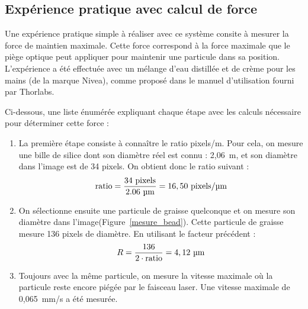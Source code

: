 \subsection{Expérience pratique avec calcul de force}
Une expérience pratique simple à réaliser avec ce système consite à mesurer la force de maintien maximale. Cette force correspond à la force maximale que le piège optique peut appliquer pour maintenir une particule dans sa position. L'expérience a été effectuée avec un mélange d'eau distillée et de crème pour les mains (de la marque Nivea), comme proposé dans le manuel d'utilisation fourni par Thorlabs.

Ci-dessous, une liste énumérée expliquant chaque étape avec les calculs nécessaire pour déterminer cette force :

\vspace{1em}
\begin{minipage}{0.6\textwidth}
    \begin{enumerate}
        \item La première étape consiste à connaître le ratio pixels/\textmu m. Pour cela, on mesure une bille de silice dont son diamètre réel est connu : 2,06~\textmu m, et son diamètre dans l'image est de 34 pixels. On obtient donc le ratio suivant :
              \[
                  \text{ratio} = \frac{34~\text{pixels}}{2.06~\text{\textmu m}} = 16,50~\text{pixels/\textmu m}
              \]
        \item On sélectionne ensuite une particule de graisse quelconque et on mesure son diamètre dans l'image(Figure~\ref{mesure_bead}). Cette particule de graisse mesure 136 pixels de diamètre. En utilisant le facteur précédent :
              \[
                  R = \frac{136}{2 \cdot \text{ratio}} = 4,12~\text{\textmu m}
              \]
        \item Toujours avec la même particule, on mesure la vitesse maximale où la particule reste encore piégée par le faisceau laser. Une vitesse maximale de 0,065~mm/s a été mesurée.
    \end{enumerate}
\end{minipage}
\hfill
